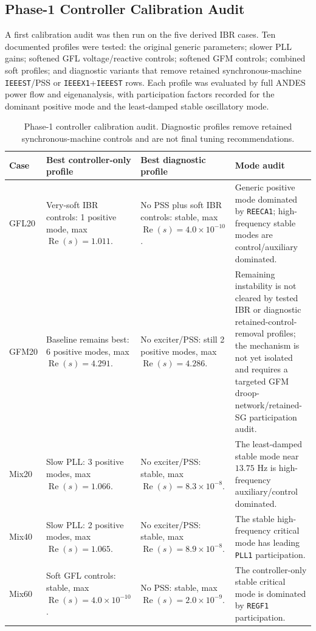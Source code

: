 \documentclass[journal]{IEEEtran}
\newcommand{\Real}{\operatorname{Re}}
\begin{document}
\subsection{Phase-1 Controller Calibration Audit}

A first calibration audit was then run on the five derived IBR cases. Ten documented profiles were tested: the original generic parameters; slower PLL gains; softened GFL voltage/reactive controls; softened GFM controls; combined soft profiles; and diagnostic variants that remove retained synchronous-machine \texttt{IEEEST}/PSS or \texttt{IEEEX1}+\texttt{IEEEST} rows. Each profile was evaluated by full ANDES power flow and eigenanalysis, with participation factors recorded for the dominant positive mode and the least-damped stable oscillatory mode.

\begin{table}[t]
\centering
\caption{Phase-1 controller calibration audit. Diagnostic profiles remove retained synchronous-machine controls and are not final tuning recommendations.}
\label{tab:phase1calibration}
\scriptsize
\begin{tabular}{@{}p{}p{}p{}p{}@{}}
\toprule
Case & Best controller-only profile & Best diagnostic profile & Mode audit\\
\midrule
GFL20
& Very-soft IBR controls: 1 positive mode, max $\Real(s)=1.011$.
& No PSS plus soft IBR controls: stable, max $\Real(s)=4.0{\times}10^{-10}$.
& Generic positive mode dominated by \texttt{REECA1}; high-frequency stable modes are control/auxiliary dominated.\\
GFM20
& Baseline remains best: 6 positive modes, max $\Real(s)=4.291$.
& No exciter/PSS: still 2 positive modes, max $\Real(s)=4.286$.
& Remaining instability is not cleared by tested IBR or diagnostic retained-control-removal profiles; the mechanism is not yet isolated and requires a targeted GFM droop-network/retained-SG participation audit.\\
Mix20
& Slow PLL: 3 positive modes, max $\Real(s)=1.066$.
& No exciter/PSS: stable, max $\Real(s)=8.3{\times}10^{-8}$.
& The least-damped stable mode near $13.75$ Hz is high-frequency auxiliary/control dominated.\\
Mix40
& Slow PLL: 2 positive modes, max $\Real(s)=1.065$.
& No exciter/PSS: stable, max $\Real(s)=8.9{\times}10^{-8}$.
& The stable high-frequency critical mode has leading \texttt{PLL1} participation.\\
Mix60
& Soft GFL controls: stable, max $\Real(s)=4.0{\times}10^{-10}$.
& No PSS: stable, max $\Real(s)=2.0{\times}10^{-9}$.
& The controller-only stable critical mode is dominated by \texttt{REGF1} participation.\\
\bottomrule
\end{tabular}
\end{table}
\end{document}
